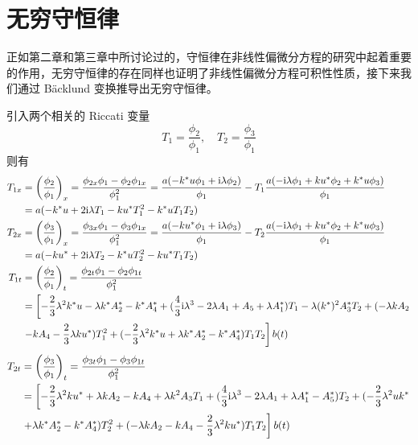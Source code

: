 \section{无穷守恒律}
正如第二章和第三章中所讨论过的，守恒律在非线性偏微分方程的研究中起着重要的作用，无穷守恒律的存在同样也证明了非线性偏微分方程可积性性质，接下来我们通过 B\"{a}cklund 变换推导出无穷守恒律。

引入两个相关的 Riccati 变量
\begin{equation}
  T_{1} = \frac{\phi_{2}}{\phi_{1}}, \quad T_{2} = \frac{\phi_{3}}{\phi_{1}}
\end{equation}
则有
\begin{align}
  T_{1x} &= \left(\frac{\phi_2}{\phi_1}\right)_x=\frac{\phi_{2x}\phi_1-\phi_2\phi_{1x}}{\phi_1^2}=\frac{a(-k^*u\phi_1+\mathrm{i}\lambda\phi_2)}{\phi_1}-T_1\frac{a(-\mathrm{i}\lambda\phi_1+ku^*\phi_2+k^*u\phi_3)}{\phi_1}\nonumber\\
  &= a(-k^{*}u + 2\mathrm{i}\lambda T_{1} - ku^{*}T_{1}^{2} - k^{*}uT_{1}T_{2}) \label{nss-t1x} \\
  T_{2x} &=\left(\frac{\phi_3}{\phi_1}\right)_x=\frac{\phi_{3x}\phi_1-\phi_3\phi_{1x}}{\phi_1^2}=\frac{a(-ku^*\phi_1+\mathrm{i}\lambda\phi_3)}{\phi_1}-T_2\frac{a(-\mathrm{i}\lambda\phi_1+ku^*\phi_2+k^*u\phi_3)}{\phi_1}\nonumber\\
  &= a(-ku^{*} + 2\mathrm{i}\lambda T_{2} - k^{*}uT_{2}^{2} - ku^{*}T_{1}T_{2}) \label{nss-t2x} \\
  T_{1t}  &=\left(\frac{\phi_2}{\phi_1}\right)_t=\frac{\phi_{2t}\phi_1-\phi_2\phi_{1t}}{\phi_1^2}\nonumber\\
  &= \left[-\frac{2}{3}\lambda^{2}k^{*}u - \lambda k^{*}A_{2}^{*} - k^{*}A_{4}^{*} + (\frac{4}{3}\mathrm{i}\lambda^{3}-2\lambda A_{1}+A_{5}+\lambda A_{1}^{*})T_{1} - \lambda (k^{*})^{2}A_{3}^{*}T_{2} + (-\lambda kA_{2} \right.\notag\\
  & \left. - kA_{4} - \frac{2}{3}\lambda ku^{*})T_{1}^{2} + (-\frac{2}{3}\lambda^{2}k^{*}u+\lambda k^{*}A_{2}^{*}-k^{*}A_{4}^{*})T_{1}T_{2} \right]b(t)
\end{align}
\begin{align}
  T_{2t} &=\left(\frac{\phi_3}{\phi_1}\right)_t=\frac{\phi_{3t}\phi_1-\phi_3\phi_{1t}}{\phi_1^2}\nonumber\\
  &= \left[-\frac{2}{3}\lambda^{2}ku^{*} + \lambda kA_{2} - kA_{4} + \lambda k^{2}A_{3}T_{1} + (\frac{4}{3}\mathrm{i}\lambda^{3}-2\lambda A_{1}+\lambda A_{1}^{*}-A_{5}^{*})T_{2} + (-\frac{2}{3}\lambda^{2}uk^{*} \right. \notag\\
  & \left. +\lambda k^{*}A_{2}^{*}-k^{*}A_{4}^{*})T_{2}^{2} + (-\lambda kA_{2}-kA_{4}-\frac{2}{3}\lambda^{2}ku^{*})T_{1}T_{2} \right]b(t)
\end{align}
